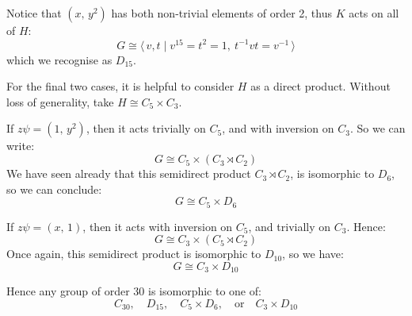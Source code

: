 Notice that \((x,\,y^2)\) has both non-trivial elements of order 2, thus \(K\) acts on all of \(H\):
\[G \cong \langle\, v, t \mid v^{15} = t^2 = 1,\ t^{-1}vt = v^{-1}\,\rangle\]
which we recognise as \(D_{15}\).

For the final two cases, it is helpful to consider \(H\) as a direct product.
Without loss of generality, take \(H \cong C_5 \times C_3\).

If \(z\psi = (1,\,y^2)\), then it acts trivially on \(C_5\), and with inversion on \(C_3\).
So we can write:
\[G \cong C_5 \times (C_3 \rtimes C_2)\]
We have seen already that this semidirect product \(C_3 \rtimes C_2\), is isomorphic to \(D_6\), so we can conclude:
\[G \cong C_5 \times D_6\]

If \(z\psi = (x,\,1)\), then it acts with inversion on \(C_5\), and trivially on \(C_3\).
Hence:
\[G \cong C_3 \times (C_5 \rtimes C_2)\]
Once again, this semidirect product is isomorphic to \(D_{10}\), so we have:
\[G \cong C_3 \times D_{10}\]

Hence any group of order 30 is isomorphic to one of:
\[
    C_{30}, \quad%
    D_{15}, \quad%
    C_5 \times D_6, \quad \text{or} \quad%
    C_3 \times D_{10}
\]

